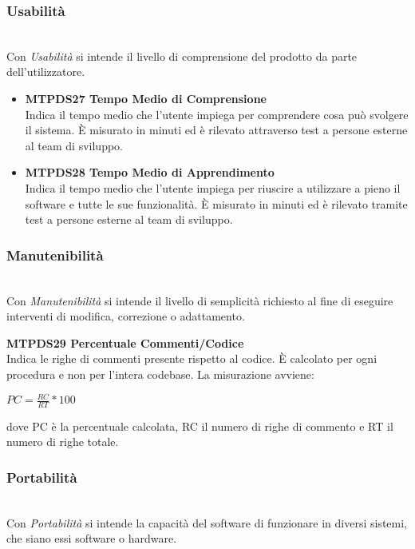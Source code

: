 \subsubsection{Usabilità}\-\\
Con \textit{Usabilità} si intende il livello di comprensione del prodotto da parte dell'utilizzatore.
\begin{itemize}
	\item\textbf{MTPDS27 Tempo Medio di Comprensione}\-\\
Indica il tempo medio che l'utente impiega per comprendere cosa può svolgere il sistema. È misurato in minuti ed è rilevato attraverso test a persone esterne al team di sviluppo.

	\item\textbf{MTPDS28 Tempo Medio di Apprendimento}\-\\
Indica il tempo medio che l'utente impiega per riuscire a utilizzare a pieno il software e tutte le sue funzionalità. È  misurato in minuti ed è rilevato tramite test a persone esterne al team di sviluppo. 

\end{itemize}

\subsubsection{Manutenibilità}\-\\
Con \textit{Manutenibilità} si intende il livello di semplicità richiesto al fine di eseguire interventi di modifica, correzione o adattamento.
\begin{itemize}
	\item \textbf{MTPDS29 Percentuale Commenti/Codice}\-\\
	Indica le righe di commenti presente rispetto al codice. È  calcolato per ogni procedura e non per l'intera codebase. La misurazione avviene:
	\begin{center}
		\item $PC = \frac{RC}{RT}*100$
	\end{center}
	dove PC è la percentuale calcolata, RC il numero di righe di commento e RT il numero di righe totale.
\end{itemize}

\subsubsection{Portabilità}\-\\
Con \textit{Portabilità} si intende la capacità del software di funzionare in diversi sistemi, che siano essi software o hardware.